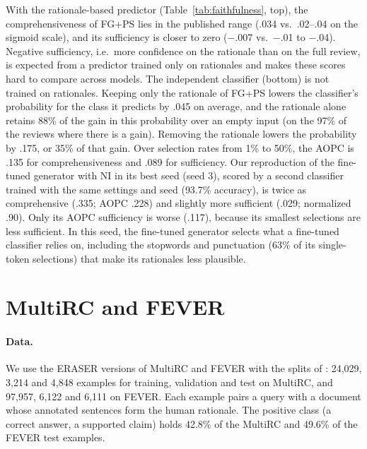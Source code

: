 \documentclass[11pt]{article}
\begin{document}
\begin{table}[t]
\label{tab:faithfulness}
\end{table}

With the rationale-based predictor (Table~\ref{tab:faithfulness}, top), the comprehensiveness of FG+PS lies in the published range (.034 vs.\ .02--.04 on the sigmoid scale), and its sufficiency is closer to zero ($-$.007 vs.\ $-$.01 to $-$.04). Negative sufficiency, i.e.\ more confidence on the rationale than on the full review, is expected from a predictor trained only on rationales and makes these scores hard to compare across models. The independent classifier (bottom) is not trained on rationales. Keeping only the rationale of FG+PS lowers the classifier's probability for the class it predicts by .045 on average, and the rationale alone retains 88\% of the gain in this probability over an empty input (on the 97\% of the reviews where there is a gain). Removing the rationale lowers the probability by .175, or 35\% of that gain. Over selection rates from 1\% to 50\%, the AOPC is .135 for comprehensiveness and .089 for sufficiency. Our reproduction of the fine-tuned generator with NI in its best seed (seed 3), scored by a second classifier trained with the same settings and seed (93.7\% accuracy), is twice as comprehensive (.335; AOPC .228) and slightly more sufficient (.029; normalized .90). Only its AOPC sufficiency is worse (.117), because its smallest selections are less sufficient. In this seed, the fine-tuned generator selects what a fine-tuned classifier relies on, including the stopwords and punctuation (63\% of its single-token selections) that make its rationales less plausible.

\section{MultiRC and FEVER}
\label{app:sentence}

\paragraph{Data.} We use the ERASER versions of MultiRC and FEVER \citep{deyoung-etal-2020-eraser} with the splits of \citet{storek-etal-2023-unsupervised}: 24,029, 3,214 and 4,848 examples for training, validation and test on MultiRC, and 97,957, 6,122 and 6,111 on FEVER. Each example pairs a query with a document whose annotated sentences form the human rationale. The positive class (a correct answer, a supported claim) holds 42.8\% of the MultiRC and 49.6\% of the FEVER test examples.
\end{document}
